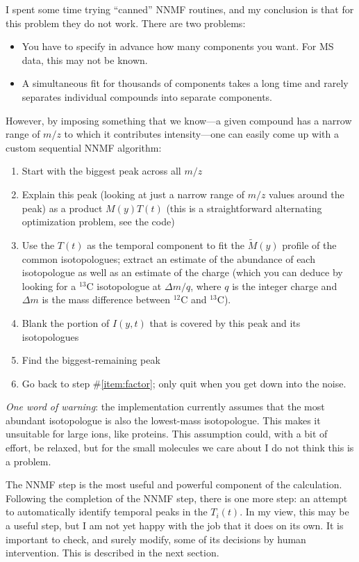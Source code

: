 \documentclass[notitlepage]{revtex4-1}
\begin{document}
I spent some time trying ``canned'' NNMF routines, and my conclusion is that for this problem they do not work.  There are two problems:
\begin{itemize}
\item You have to specify in advance how many components you want.  For MS data, this may not be known.
\item A simultaneous fit for thousands of components takes a long time and rarely separates individual compounds into separate components.
\end{itemize}
However, by imposing something that we know---a given compound has a narrow range of $m/z$ to which it contributes intensity---one can easily come up with a custom sequential NNMF algorithm:
\begin{enumerate}
\item Start with the biggest peak across all $m/z$
\item \label{item:factor} Explain this peak (looking at just a narrow range of $m/z$ values around the peak) as a product $M(y) T(t)$ (this is a straightforward alternating optimization problem, see the code)
\item Use the $T(t)$ as the temporal component to fit the $\tilde M(y)$ profile of the common isotopologues; extract an estimate of the abundance of each isotopologue as well as an estimate of the charge (which you can deduce by looking for a $^{13}$C isotopologue at $\Delta m/q$, where $q$ is the integer charge and $\Delta m$ is the mass difference between $^{12}$C and $^{13}$C).
\item Blank the portion of $I(y,t)$ that is covered by this peak and its isotopologues
\item Find the biggest-remaining peak
\item Go back to step \#\ref{item:factor}; only quit when you get down into the noise.
\end{enumerate}
\emph{One word of warning}: the implementation currently assumes that the most abundant isotopologue is also the lowest-mass isotopologue.  This makes it unsuitable for large ions, like proteins.  This assumption could, with a bit of effort, be relaxed, but for the small molecules we care about I do not think this is a problem.

The NNMF step is the most useful and powerful component of the calculation.  Following the completion of the NNMF step, there is one more step:  an attempt to automatically identify temporal peaks in the $T_i(t)$.  In my view, this may be a useful step, but I am not yet happy with the job that it does on its own.  It is important to check, and surely modify, some of its decisions by human intervention.  This is described in the next section.
\end{document}
